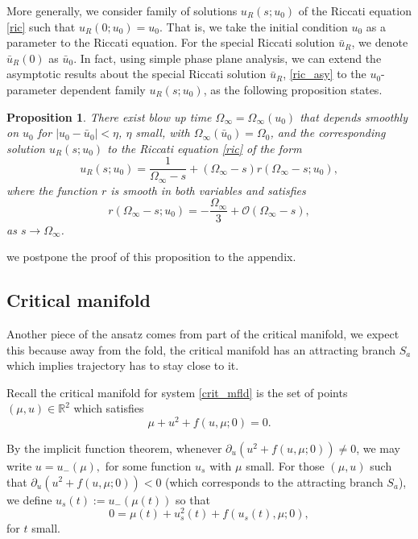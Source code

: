 \documentclass[letterpaper,11pt]{article}
\newcommand{\rmO}{\mathcal{O}}
\numberwithin{equation}{section}
\theoremstyle{plain}
\newtheorem{proposition}[theorem]{Proposition}
\begin{document}
More generally, we consider family of solutions  $u_R(s; u_0)$ of the Riccati equation  \eqref{ric} such that $u_R(0; u_0) = u_0$. That is, we take the initial condition $u_0$ as a parameter to the Riccati equation. For the special Riccati solution $\bar{u}_R$, we denote $\bar{u}_R(0) $ as $\bar{u}_0$. In fact, using simple phase plane analysis, we can extend the asymptotic results about the special Riccati solution $\bar{u}_R$, \eqref{ric_asy} to the $u_0$-parameter dependent family $u_R(s; u_0)$, as the following proposition states.

\begin{proposition}\label{para_ric}
There exist blow up time $\Omega_\infty = \Omega_\infty(u_0)$ that depends smoothly on $u_0$ for $|u_0 - \bar{u}_0|<\eta$, $\eta$ small, with $\Omega_\infty(\bar{u}_0) = \Omega_0$, and the corresponding solution $u_R(s; u_0)$ to the Riccati equation \eqref{ric} of the form
\begin{equation}\label{ric_exp}
u_R(s;u_0) = \frac{1}{\Omega_\infty-s} +  (\Omega_\infty-s) r(\Omega_\infty-s;u_0),
\end{equation}
where the function $r$ is smooth in both variables and satisfies
\begin{equation}\label{ric_reminder}
r( \Omega_\infty-s; u_0) = -\frac{\Omega_\infty}{3} + \rmO(\Omega_\infty-s),
\end{equation}
as $s \to \Omega_\infty$.
\end{proposition}
we postpone the proof of this proposition to the appendix.
\subsection{Critical manifold}\label{c_mfld}
Another piece of the ansatz comes from part of  the critical manifold, we expect this because away from the fold, the critical manifold has an attracting branch $S_a$ which implies trajectory has to stay close to it. 

Recall the critical manifold for system \eqref{crit_mfld} is the set of points $(\mu, u) \in \mathbb{R}^2$ which satisfies
\begin{equation} \label{crit_mfld}
\mu + u^2 + f(u,\mu; 0) =  0.
\end{equation}

By the implicit function theorem, whenever $\partial_u( u^2+f(u,\mu;0) ) \neq 0$, we may write $u=u_-(\mu),$ for some function $u_s$ with $\mu$ small. For those $(\mu, u)$ such that $\partial_u( u^2+f(u,\mu;0) )<0$ (which corresponds to the attracting branch $S_a$), we define $u_s(t):= u_-(\mu(t))$ so that
\begin{equation}\label{singular}
0 = \mu(t) + u_s^2(t)+f(u_s(t),\mu; 0),
\end{equation}
for $t$ small.  
\end{document}
